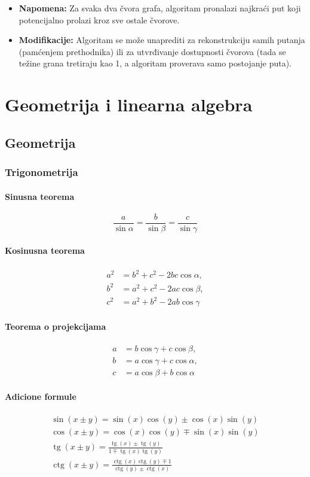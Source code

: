 \documentclass[a4paper,12pt,twoside]{report}
\numberwithin{algorithm}{section}
\renewcommand{\tan}{\operatorname{tg}}
\renewcommand{\cot}{\operatorname{ctg}}
\begin{document}
\begin{itemize}
    \item \textbf{Napomena:} Za svaka dva čvora grafa, algoritam pronalazi najkraći put koji potencijalno prolazi kroz sve ostale čvorove. 
    \item \textbf{Modifikacije:} Algoritam se može unaprediti za rekonstrukciju samih putanja (pamćenjem prethodnika) ili za utvrđivanje dostupnosti čvorova (tada se težine grana tretiraju kao 1, a algoritam proverava samo postojanje puta).
\end{itemize}


\part{Geometrija i linearna algebra}

\chapter{Geometrija}
\section{Trigonometrija}
\subsection{Sinusna teorema}
\[
\frac{a}{\sin \alpha} = \frac{b}{\sin \beta} = \frac{c}{\sin \gamma}
\]

\subsection{Kosinusna teorema}
\[
\begin{aligned}
a^2 &= b^2 + c^2 - 2bc \cos \alpha, \\
b^2 &= a^2 + c^2 - 2ac \cos \beta, \\
c^2 &= a^2 + b^2 - 2ab \cos \gamma
\end{aligned}
\]

\subsection{Teorema o projekcijama}
\[
\begin{aligned}
a &= b \cos \gamma + c \cos \beta, \\
b &= a \cos \gamma + c \cos \alpha, \\
c &= a \cos \beta + b \cos \alpha
\end{aligned}
\]
\subsection{Adicione formule}
\[
\begin{aligned}
\sin(x \pm y) = \sin(x)\cos(y) \pm \cos(x)\sin(y) \\
\cos(x \pm y) = \cos(x)\cos(y) \mp \sin(x)\sin(y) \\
\tan(x \pm y) = \frac{\tan(x) \pm \tan(y)}{1 \mp \tan(x)\tan(y)} \\
\cot(x \pm y) = \frac{\cot(x)\cot(y) \mp 1}{\cot(y) \pm \cot(x)} \\
\end{aligned}
\]
\end{document}
